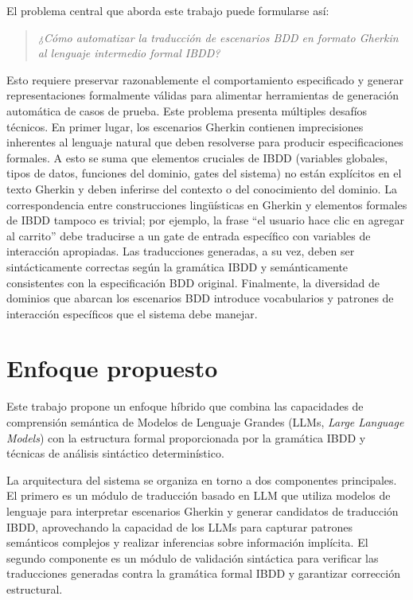 El problema central que aborda este trabajo puede formularse así:

\begin{quote}
\centering
\textit{¿Cómo automatizar la traducción de escenarios BDD en formato Gherkin al lenguaje intermedio formal IBDD?}
\end{quote}

Esto requiere preservar razonablemente el comportamiento especificado y generar representaciones formalmente válidas para alimentar herramientas de generación automática de casos de prueba. Este problema presenta múltiples desafíos técnicos. En primer lugar, los escenarios Gherkin contienen imprecisiones inherentes al lenguaje natural que deben resolverse para producir especificaciones formales. A esto se suma que elementos cruciales de IBDD (variables globales, tipos de datos, funciones del dominio, gates del sistema) no están explícitos en el texto Gherkin y deben inferirse del contexto o del conocimiento del dominio. La correspondencia entre construcciones lingüísticas en Gherkin y elementos formales de IBDD tampoco es trivial; por ejemplo, la frase ``el usuario hace clic en agregar al carrito'' debe traducirse a un gate de entrada específico con variables de interacción apropiadas. Las traducciones generadas, a su vez, deben ser sintácticamente correctas según la gramática IBDD y semánticamente consistentes con la especificación BDD original. Finalmente, la diversidad de dominios que abarcan los escenarios BDD introduce vocabularios y patrones de interacción específicos que el sistema debe manejar.

\section{Enfoque propuesto}

Este trabajo propone un enfoque híbrido que combina las capacidades de comprensión semántica de Modelos de Lenguaje Grandes (LLMs, \textit{Large Language Models}) con la estructura formal proporcionada por la gramática IBDD y técnicas de análisis sintáctico determinístico.

La arquitectura del sistema se organiza en torno a dos componentes principales. El primero es un módulo de traducción basado en LLM que utiliza modelos de lenguaje para interpretar escenarios Gherkin y generar candidatos de traducción IBDD, aprovechando la capacidad de los LLMs para capturar patrones semánticos complejos y realizar inferencias sobre información implícita. El segundo componente es un módulo de validación sintáctica para verificar las traducciones generadas contra la gramática formal IBDD y garantizar corrección estructural.

